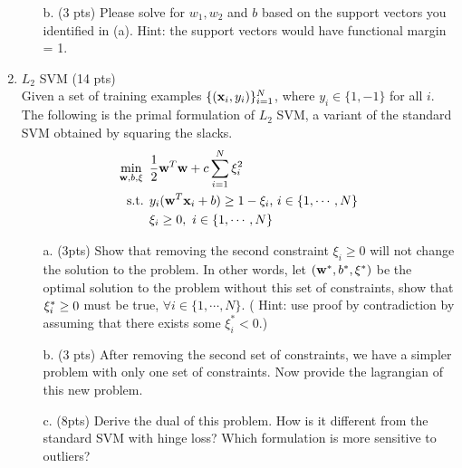 \documentclass{article}
\def\x{{\bf x}}
\def\w{{\bf w}}
\begin{document}
\begin{enumerate}
\begin{itemize}
\item[b.] (3 pts) Please solve for $w_1, w_2$ and $b$ based on the support vectors you identified in (a). Hint: the support vectors would have functional margin = 1. \\
\end{itemize}



\item $L_2$ SVM (14 pts) \\
Given a set of training examples $\{(\x_i, y_i)\}_{i=1}^N$, where $y_i\in \{1, -1\}$ for all $i$. The following is the primal formulation of $L_2$ SVM, a variant of the standard SVM obtained by squaring the slacks.
\begin{align*}
\min_{\w, b, \xi} \mbox{ }& \frac{1}{2}\w^T\w+c\sum_{i=1}^N \xi_i^2 \\
\mbox{s.t. } & y_i(\w^T\x_i+b)\geq 1-\xi_i \mbox{,   } i \in \{1,\cdots,N\}\\
 & \xi_i\geq 0, \mbox{  }  i\in \{1,\cdots,N\}
\end{align*}

\begin{itemize}
\item [a.] (3pts) Show that removing the second constraint $\xi_i\geq 0$ will not change the solution to the problem. In other words, let $(\w^*, b^*, {\bf \xi}^*)$ be the optimal solution to the problem without this set of constraints, show that ${\bf \xi}_i^* \geq 0$ must be true, $\forall i\in\{1,\cdots,N\} $. ( Hint: use proof by contradiction by assuming that there exists some $\xi_i^*<0$.)\\
\item [b.] (3 pts) After removing the second set of constraints, we have a simpler problem with only one set of constraints. Now provide the lagrangian of this new problem.\\
\item [c.] (8pts) Derive the dual of this problem. How is it different from the standard SVM with hinge loss? Which formulation is more sensitive to outliers?\\
\end{itemize}

\end{enumerate}
\end{document}
